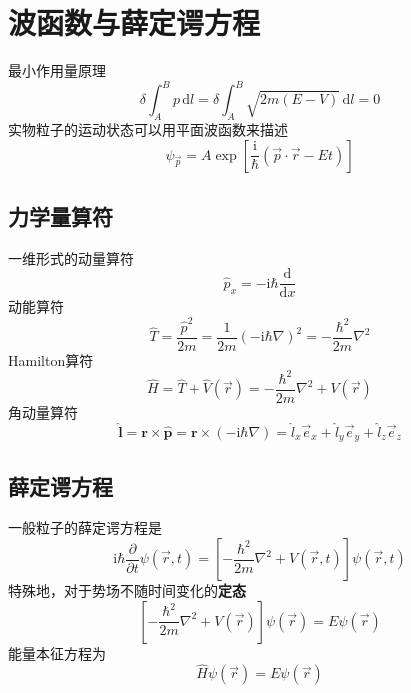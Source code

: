\section{波函数与薛定谔方程}
最小作用量原理
$$
    \delta\int_{A}^{B}p\,\mathrm{d}l = \delta\int_{A}^{B}\sqrt{2m(E-V)}\,\mathrm{d}l=0
$$
实物粒子的运动状态可以用平面波函数来描述
$$
    \psi_{\vec{p}}=A\exp\left[\frac{\mathrm{i}}{\hbar}\left(\vec{p}\cdot\vec{r}-Et\right)\right]
$$

\subsection{力学量算符}
一维形式的动量算符
$$
    \hat{p}_x = -\mathrm{i}\hbar\frac{\mathrm{d}}{\mathrm{d}x}
$$
动能算符
$$
    \hat{T}=\frac{\hat{p}^2}{2m}
    =\frac{1}{2m}\left(-\mathrm{i}\hbar\nabla\right)^2
    =-\frac{\hbar^2}{2m}\nabla^2
$$
Hamilton算符
$$
    \hat{H}=\hat{T}+\hat{V}(\vec{r})=-\frac{\hbar^2}{2m}\nabla^2+V(\vec{r})
$$
角动量算符
$$
    \hat{\boldsymbol{l}}
    = \boldsymbol{r} \times \hat{\boldsymbol{p}}
    = \boldsymbol{r} \times (-\mathrm{i}\hbar\nabla)
    = \hat{l}_x\vec{e}_x + \hat{l}_y\vec{e}_y + \hat{l}_z\vec{e}_z
$$

\subsection{薛定谔方程}
一般粒子的薛定谔方程是
$$
    \mathrm{i}\hbar\frac{\partial }{\partial t}\psi(\vec{r}, t) = \left[-\frac{\hbar^2}{2m}\nabla^2 + V(\vec{r}, t)\right]\psi(\vec{r}, t)
$$
特殊地，对于势场不随时间变化的\textbf{定态}
$$
    \left[-\frac{\hbar^2}{2m}\nabla^2 + V(\vec{r})\right]\psi(\vec{r}) = E\psi(\vec{r})
$$
能量本征方程为
$$
    \hat{H}\psi(\vec{r}) =E\psi(\vec{r})
$$


